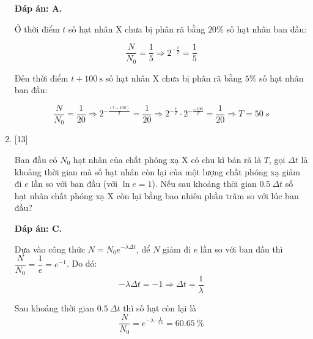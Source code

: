 \begin{enumerate}[label=\bfseries Câu \arabic*:]
	\loigiai
	{		\textbf{Đáp án: A.}
		
		Ở thời điểm $t$ số hạt nhân X chưa bị phân rã bằng $20\%$ số hạt nhân ban đầu:
		
		$$\dfrac{N}{N_0}=\dfrac{1}{5} \Rightarrow 2^{-\frac{t}{T}} = \dfrac{1}{5}$$
		
		Đến thời điểm $t+100\ \text{s}$ số hạt nhân X chưa bị phân rã bằng $5\%$ số hạt nhân ban đầu:
		
		$$\dfrac{N}{N_0}=\dfrac{1}{20} \Rightarrow 2^{-\frac{(t+100)}{T}} = \dfrac{1}{20} \Rightarrow 2^{-\frac{t}{T}} \cdot 2^{-\frac{-100}{T}} = \dfrac{1}{20} \Rightarrow T = \SI{50}{s}$$
	}
	
	
	\item {} [13]
	\cauhoi
	{Ban đầu có $N_0$ hạt nhân của chất phóng xạ X có chu kì bán rã là $T$, gọi $\Delta t$ là khoảng thời gian mà số hạt nhân còn lại của một lượng chất phóng xạ giảm đi $e$ lần so với ban đầu (với $\ln e = 1$). Nếu sau khoảng thời gian $\SI{0.5}{} \Delta t$ số hạt nhân chất phóng xạ X còn lại bằng bao nhiêu phần trăm so với lúc ban đầu?
	}
	
	\loigiai
	{		\textbf{Đáp án: C.}
		
		Dựa vào công thức $N=N_0 e^{-\lambda \Delta t}$, để $N$ giảm đi $e$ lần so với ban đầu thì $\dfrac{N}{N_0} = \dfrac{1}{e} = e^{-1}$. Do đó:
		$$-\lambda \Delta t = -1 \Rightarrow \Delta t = \dfrac{1}{\lambda}$$
		
		Sau khoảng thời gian $\SI{0.5}{} \Delta t$ thì số hạt còn lại là
		$$\dfrac{N}{N_0} = e^{-\lambda \cdot \frac{1}{2\lambda}} = \SI{60.65}{\percent}$$
		
	}
	
	
\end{enumerate}
